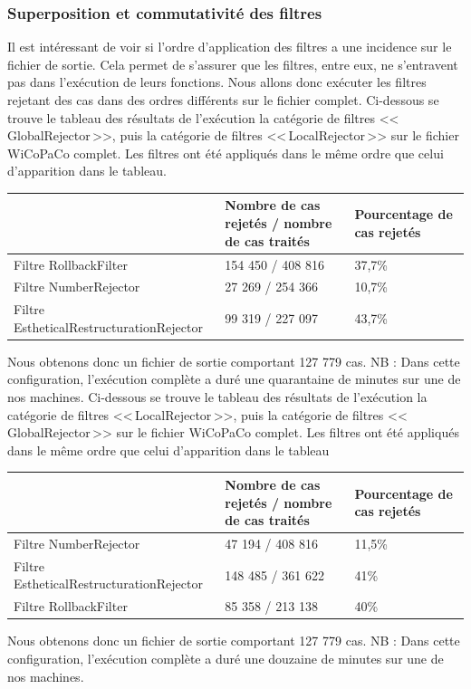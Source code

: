 \documentclass[11pt]{article}
\begin{document}
\subsubsection{Superposition et commutativit\'{e} des filtres}
Il est int\'{e}ressant de voir si l'ordre d'application des filtres a une incidence sur le fichier de sortie. Cela permet de s'assurer que les filtres, entre eux, ne s'entravent pas dans l'ex\'{e}cution de leurs fonctions. 
Nous allons donc ex\'{e}cuter les filtres rejetant des cas dans des ordres diff\'{e}rents sur le fichier complet.
\newline
\newline
Ci-dessous se trouve le tableau des r\'{e}sultats de l'ex\'{e}cution la cat\'{e}gorie de filtres <<\,GlobalRejector\,>>, puis la cat\'{e}gorie de filtres <<\,LocalRejector\,>> sur le fichier WiCoPaCo complet. Les filtres ont \'{e}t\'{e} appliqu\'{e}s dans le m\^{e}me ordre que celui d'apparition dans le tableau.
\begin{center}
\begin{tabular}{|M{6cm}|M{5cm}|M{6cm}|}
   \hline
    \, &Nombre de cas rejet\'{e}s / nombre de cas trait\'{e}s & Pourcentage de cas rejet\'{e}s \tabularnewline
   \hline
    Filtre RollbackFilter & 154 450 / 408 816 & 37,7\% \tabularnewline
   \hline
    Filtre NumberRejector & 27 269 / 254 366 & 10,7\% \tabularnewline
\hline
Filtre EstheticalRestructurationRejector & 99 319 / 227 097 & 43,7\% \tabularnewline
\hline
\end{tabular}
\end{center}
Nous obtenons donc un fichier de sortie comportant 127 779 cas.
\newline
NB : Dans cette configuration, l'ex\'{e}cution compl\`{e}te a dur\'{e} une quarantaine de minutes sur une de nos machines.
\newline
\newline
Ci-dessous se trouve le tableau des r\'{e}sultats de l'ex\'{e}cution la cat\'{e}gorie de filtres <<\,LocalRejector\,>>,  puis la cat\'{e}gorie de filtres <<\,GlobalRejector\,>> sur le fichier WiCoPaCo complet. Les filtres ont \'{e}t\'{e} appliqu\'{e}s dans le m\^{e}me ordre que celui d'apparition dans le tableau
\begin{center}
\begin{tabular}{|M{6cm}|M{5cm}|M{6cm}|}
   \hline
    \, &Nombre de cas rejet\'{e}s / nombre de cas trait\'{e}s & Pourcentage de cas rejet\'{e}s \tabularnewline
   \hline
    Filtre NumberRejector & 47 194 / 408 816 & 11,5\% \tabularnewline
\hline
Filtre EstheticalRestructurationRejector & 148 485 / 361 622 & 41\% \tabularnewline
 \hline
    Filtre RollbackFilter & 85 358 / 213 138 & 40\% \tabularnewline
\hline
\end{tabular}
\end{center}
Nous obtenons donc un fichier de sortie comportant 127 779 cas.
\newline
NB : Dans cette configuration, l'ex\'{e}cution compl\`{e}te a dur\'{e} une douzaine de minutes sur une de nos machines.
\newline
\newline
\end{document}
